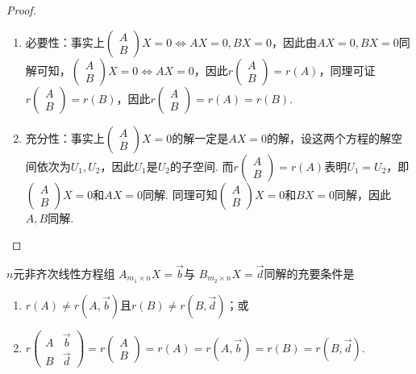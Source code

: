\begin{proof}
\begin{enumerate}
    \item 必要性：事实上$\begin{pmatrix}
        A \\ B
    \end{pmatrix}X=0\iff AX=0,BX=0$，因此由$AX=0,BX=0$同解可知，$\begin{pmatrix}
        A \\ B
    \end{pmatrix}X=0\iff AX=0$，因此$r\begin{pmatrix}
        A \\ B
    \end{pmatrix}=r(A)$，同理可证$r\begin{pmatrix}
        A \\ B
    \end{pmatrix}=r(B)$，因此$r\begin{pmatrix}
        A \\ B
    \end{pmatrix}=r(A)=r(B)$.

    \item 充分性：事实上$\begin{pmatrix}
        A \\ B
    \end{pmatrix}X=0$的解一定是$AX=0$的解，设这两个方程的解空间依次为$U_1,U_2$，因此$U_1$是$U_2$的子空间. 而$r\begin{pmatrix}
        A \\ B
    \end{pmatrix}=r(A)$表明$U_1=U_2$，即$\begin{pmatrix}
        A \\ B
    \end{pmatrix}X=0$和$AX=0$同解. 同理可知$\begin{pmatrix}
        A \\ B
    \end{pmatrix}X=0$和$BX=0$同解，因此$A,B$同解.
\end{enumerate}
\end{proof}

\begin{theorem}
    $n$元非齐次线性方程组 $A_{m_1 \times n}X=\vec{b}$与 $B_{m_2 \times n}X=\vec{d}$同解的充要条件是
    \begin{enumerate}
        \item $r(A)\neq r(A,\vec{b})$且$r(B)\neq r(B,\vec{d})$；或

        \item $r\begin{pmatrix}
                      A & \vec{b} \\ B & \vec{d}
                  \end{pmatrix}=r\begin{pmatrix}
                      A \\ B
                  \end{pmatrix}=r(A)=r(A,\vec{b})=r(B)=r(B,\vec{d})$.
    \end{enumerate}
\end{theorem}

